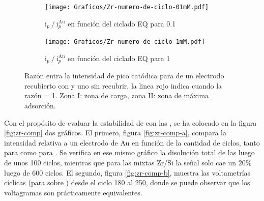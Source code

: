 		 			\begin{figure}[th]
			   	    \begin{subfigure}[t]{0.495\textwidth}
			        	\texttt{[image: Graficos/Zr-numero-de-ciclo-01mM.pdf]}
			        	\vspace*{-6mm}\caption{$\text{i}_p\mathbin{/}\text{i}_p^{\text{Au}}$ en función del ciclado EQ para \ru\space \SI{0.1}{\milli\Molar}}
			         	\end{subfigure}
			     		 \begin{subfigure}[t]{0.495\textwidth}
			        	\texttt{[image: Graficos/Zr-numero-de-ciclo-1mM.pdf]}
			        	\vspace*{-6mm	}\caption{$\text{i}_p\mathbin{/}\text{i}_p^{\text{Au}}$ en función del ciclado EQ para \ru\space \SI{1}{\milli\Molar}}
			         	\end{subfigure}
			         	\caption[Intensidad en función del ciclado EQ para \pdmZ]{Razón entra la intensidad de pico catódica para \ru\space de un electrodo recubierto con \pdmZ\space y uno sin recubrir, la linea rojo indica cuando la razón = 1. Zona I: zona de carga, zona II: zona de máxima adsorción.}
			         	\label{fig:ventana-zr}
			     	\end{figure}
			     		
		 Con el propósito de evaluar la estabilidad de \pdmZ\space con las \pdmF, se ha colocado en la figura \ref{fig:zr-comp} dos gráficos. El primero, figura \ref{fig:zr-comp-a}, compara la intensidad relativa a un electrodo de Au en función de la cantidad de ciclos, tanto para \pdmZ\space como para \pdmF. Se verifica en ese mismo gráfico la disolución total de las \pdmF\space luego de unos 100 ciclos, mientras que para las mixtas Zr/Si la señal solo cae un 20\% luego de 600 ciclos. El segundo, figura \ref{fig:zr-comp-b}, muestra las voltametrías cíclicas (para \ru\space sobre \pdmZ) desde el ciclo 180 al 250, donde se puede observar que los voltagramas son prácticamente equivalentes.

